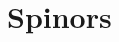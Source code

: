 \documentclass[epsfig,12pt]{article}
\begin{document}
\pagebreak
\appendix
\setcounter{equation}{0}


\section{Spinors}
\label{section-spinors}
\end{document}
